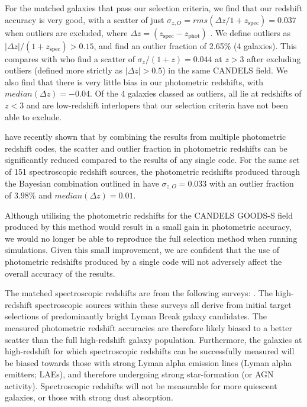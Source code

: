 For the matched galaxies that pass our selection criteria, we find that our redshift accuracy is very good, with a scatter of just $\sigma_{z,O} = rms(\Delta z /1+z_{\text{spec}}) = 0.037$ when outliers are excluded, where $\Delta z =  (z_{\text{spec}}-z_{\text{phot}})$ \citep{Dahlen:2013eu}. We define outliers as $\left | \Delta z \right |/(1+z_{\text{spec}}) > 0.15$, and find an outlier fraction of 2.65\% (4 galaxies). This compares with \citet{2012ApJ...756..164F} who find a scatter of $\sigma_{z}/(1+z) = 0.044$  at $z > 3$ after excluding outliers (defined more strictly as $\left | \Delta z \right | > 0.5$) in the same CANDELS field. We also find that there is very little bias in our photometric redshifts, with $median(\Delta z) = -0.04$. Of the 4 galaxies classed as outliers, all lie at redshifts of $z < 3$ and are low-redshift interlopers that our selection criteria have not been able to exclude.

\citet{Dahlen:2013eu} have recently shown that by combining the results from multiple photometric redshift codes, the scatter and outlier fraction in photometric redshifts can be significantly reduced compared to the results of any single code. For the same set of 151 spectroscopic redshift sources, the photometric redshifts produced through the Bayesian combination outlined in \citet{Dahlen:2013eu} have $\sigma_{z,O} = 0.033$ with an outlier fraction of 3.98\% and $median(\Delta z) = 0.01$. 

Although utilising the photometric redshifts for the CANDELS GOODS-S field produced by this method would result in a small gain in photometric accuracy, we would no longer be able to reproduce the full selection method when running simulations. Given this small improvement, we are confident that the use of photometric redshifts produced by a single code will not adversely affect the overall accuracy of the results.

The matched spectroscopic redshifts are from the following surveys: \citet{LeFvre:2004ge,Stanway:2004gu,Vanzella:2008hp,Hathi:2008ca,Popesso:2009ht,Wuyts:2009gv,Rhoads:2009eb,Vanzella:2009ez,Balestra:2010bt,Kurk:2012ej}. The high-redshift spectroscopic sources within these surveys all derive from initial target selections of predominantly bright Lyman Break galaxy candidates. The measured photometric redshift accuracies are therefore likely biased to a better scatter than the full high-redshift galaxy population. Furthermore, the galaxies at high-redshift for which spectroscopic redshifts can be successfully measured will be biased towards those with strong Lyman alpha emission lines (Lyman alpha emitters; LAEs), and therefore undergoing strong star-formation (or AGN activity). Spectroscopic redshifts will not be measurable for more quiescent galaxies, or those with strong dust absorption.

